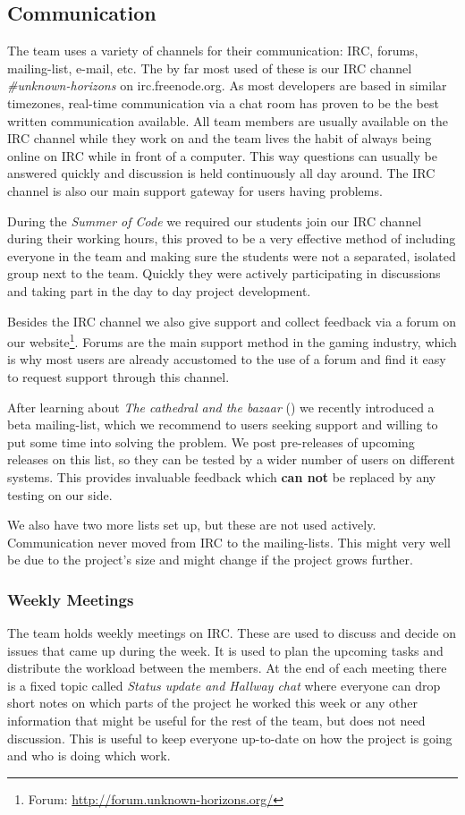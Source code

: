 \subsection{Communication}
The team uses a variety of channels for their communication: IRC, forums, mailing-list, e-mail, etc. 
The by far most used of
these is our IRC channel \textit{\#unknown-horizons} on irc.freenode.org. As most developers are based in similar
timezones, real-time communication via a chat room has proven to be the best written communication available. All team members are
usually available on the IRC channel while they work on \UH{} and the team lives the habit of always being online on
IRC while in front of a computer. This way questions can usually be answered quickly and discussion is held continuously
all day around. The IRC channel is also our main support gateway for users having problems.

During the \textit{Summer of Code} we required our students join our IRC channel during their working hours, this proved
to be a very effective method of including everyone in the team and making sure the students were not a separated,
isolated group next to the team. Quickly they were actively participating in discussions and taking part in the day to
day project development.

Besides the IRC channel we also give support and collect feedback via a forum on our website\footnote{\UH{} Forum:
\url{http://forum.unknown-horizons.org/}}. Forums are the main support method in the gaming industry, which is why most
users are already accustomed to the use of a forum and find it easy to request support through this channel.

After learning about \textit{The cathedral and the bazaar} (\cite{springerlink:10.1007/s12130-999-1026-0}) we recently
introduced a beta mailing-list, which we recommend to users seeking support and willing to put some time into
solving the problem. We post pre-releases of upcoming releases on this list, so they can be tested by a wider number
of users on different systems. This provides invaluable feedback which \textbf{can not} be replaced by any testing on our side.

We also have two more lists set up, but these are not used actively. Communication never moved from IRC to the
mailing-lists. This might very well be due to the project's size and might change if the project grows further.

\subsubsection{Weekly Meetings}
The team holds weekly meetings on IRC. These are used to discuss and decide on issues that came up during the week. It is
used to plan the upcoming tasks and distribute the workload between the members. At the end of each meeting there is a
fixed topic called \textit{Status update and Hallway chat} where everyone can drop short notes on which parts of the
project he worked this week or any other information that might be useful for the rest of the team, but does not need
discussion. This is useful to keep everyone up-to-date on how the project is going and who is doing which work.

